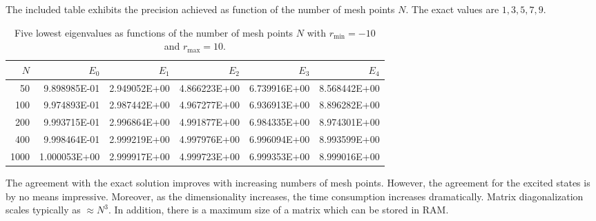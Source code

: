 The included table exhibits the precision achieved as function
of the number of mesh points $N$. The exact values are $1,3,5,7,9$.
\begin{table}[hbtp]
\begin{center}
\caption{Five lowest eigenvalues as functions of the number of mesh points
         $N$ with $r_{\mathrm{min}}=-10$ and 
$r_{\mathrm{max}}=10$.}
\begin{tabular}{rrrrrr}\hline
$N$&$E_0$&$E_1$&$E_2$&$E_3$&$E_4$ \\\hline
 50  & 9.898985E-01& 2.949052E+00      &4.866223E+00     &6.739916E+00      &8.568442E+00     \\
100   & 9.974893E-01     & 2.987442E+00    &4.967277E+00      &6.936913E+00     & 8.896282E+00       \\
200   & 9.993715E-01     &2.996864E+00     & 4.991877E+00    & 6.984335E+00    &  8.974301E+00      \\
400   & 9.998464E-01     & 2.999219E+00   & 4.997976E+00      &6.996094E+00      &  8.993599E+00      \\
1000   & 1.000053E+00     & 2.999917E+00    &4.999723E+00      & 6.999353E+00     & 8.999016E+00       \\ \hline
\end{tabular} 
\end{center}   
\label{tab:diagho_1}
\end{table}     

The agreement with the exact solution improves with increasing numbers
of mesh points. However, the agreement for the excited states is by no means impressive. Moreover, 
as the dimensionality increases, the time consumption
increases dramatically. Matrix diagonalization scales typically 
as $\approx N^3$.
In addition, there is a maximum size of a matrix which can be stored in
RAM. 

